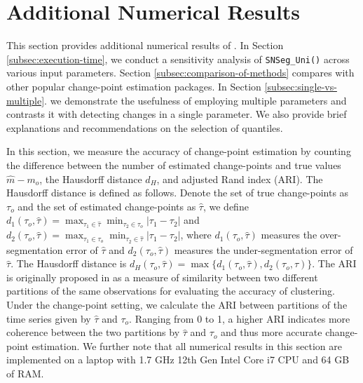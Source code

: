 

\section{{Additional Numerical Results}}\label{sec:additional}
{This section provides additional numerical results of . In Section \ref{subsec:execution-time}, we conduct a sensitivity analysis of \texttt{SNSeg\_Uni()} across various input parameters. Section \ref{subsec:comparison-of-methods} compares  with other popular change-point estimation packages. In  Section \ref{subsec:single-vs-multiple}. we demonstrate the usefulness of employing multiple parameters and contrasts it with detecting changes in a single parameter. We also provide brief explanations and recommendations on the selection of quantiles. 
}

{ In this section, we measure the accuracy of change-point estimation by counting the difference between the number of estimated change-points and true values $\hat{m}-m_o$,  the Hausdorff distance $d_H$, and adjusted Rand index (ARI). The Hausdorff distance is defined as follows. Denote the set of true change-points as $\tau_o$ and the set of estimated change-points as $\hat{\tau}$, we define $d_1(\tau_o,\hat{\tau})= \max_{\tau_1\in\hat{\tau}} \min_{\tau_2\in \tau_o} |\tau_1-\tau_2|$ and $d_2(\tau_o,\hat{\tau})= \max_{\tau_1\in\tau_o} \min_{\tau_2\in\hat{\tau}} |\tau_1-\tau_2|$, 
where $d_1(\tau_o,\hat{\tau})$ measures the over-segmentation error of $\hat{\tau}$ and $d_2(\tau_o,\hat{\tau})$ measures the under-segmentation error of $\hat{\tau}$. The Hausdorff distance is $d_H(\tau_o, \hat{\tau})= \max \{d_1(\tau_o,\hat{\tau}),d_2(\tau_o,\hat{\tau})\}$. The ARI is originally proposed in \cite{morey1984measurement}  as a measure of similarity between two different partitions of the same observations
for evaluating the accuracy of clustering. Under the change-point setting, we calculate the ARI between partitions of the time series given by $\hat{\tau}$ and $\tau_o$. Ranging from 0 to 1, a higher ARI indicates more coherence between the two partitions by $\hat{\tau}$ and $\tau_o$ and thus more accurate change-point estimation.
We further note that all numerical results in this section are implemented on a laptop with 1.7 GHz 12th Gen Intel Core i7 CPU
and 64 GB of RAM}.


